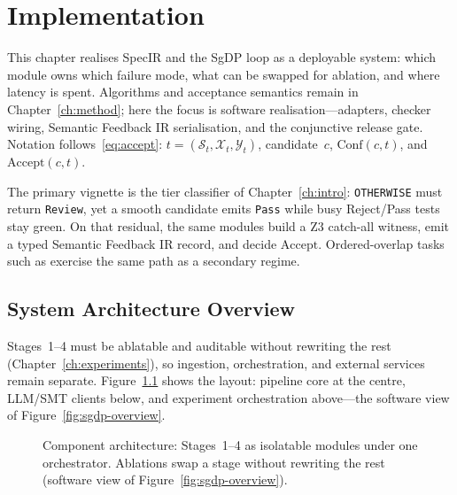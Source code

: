 
\chapter{Implementation}
\label{ch:implementation}

This chapter realises SpecIR and the SgDP loop as a deployable system:
which module owns which failure mode, what can be swapped for ablation, and
where latency is spent.
Algorithms and acceptance semantics remain in Chapter~\ref{ch:method};
here the focus is software realisation---adapters, checker wiring,
Semantic Feedback IR serialisation, and the conjunctive release gate.
Notation follows~\eqref{eq:accept}:
$t = (\mathcal{S}_t, \mathcal{X}_t, \mathcal{Y}_t)$, candidate~$c$,
$\mathrm{Conf}(c,t)$, and $\mathrm{Accept}(c,t)$.

The primary vignette is the tier classifier of Chapter~\ref{ch:intro}:
\texttt{OTHERWISE} must return \texttt{Review}, yet a smooth candidate
emits \texttt{Pass} while busy Reject/Pass tests stay green.
On that residual, the same modules build a Z3 catch-all witness, emit a
typed Semantic Feedback IR record, and decide $\mathrm{Accept}$.
Ordered-overlap tasks such as  exercise the same
path as a secondary regime.

\section{System Architecture Overview}
\label{sec:impl:architecture}

Stages~1--4 must be ablatable and auditable without rewriting the rest
(Chapter~\ref{ch:experiments}), so ingestion, orchestration, and external
services remain separate.
Figure~\ref{fig:component-arch} shows the layout: pipeline core at the
centre, LLM/SMT clients below, and experiment orchestration above---the
software view of Figure~\ref{fig:sgdp-overview}.

\begin{figure}[t]
  \centering
  \caption{Component architecture: Stages~1--4 as isolatable modules under one
    orchestrator.
    Ablations swap a stage without rewriting the rest (software view of
    Figure~\ref{fig:sgdp-overview}).}
  \label{fig:component-arch}
\end{figure}

